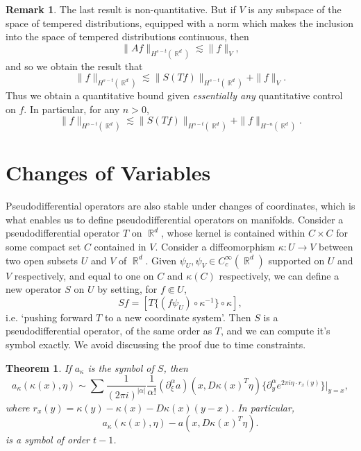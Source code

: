 \documentclass{article}
\DeclareMathOperator{\RR}{\mathbb{R}}
\theoremstyle{plain}
\newtheorem{theorem}{Theorem}
\theoremstyle{definition}
\newtheorem*{remark}{Remark}
\begin{document}
\begin{remark}
    The last result is non-quantitative. But if $V$ is any subspace of the space of tempered distributions, equipped with a norm which makes the inclusion into the space of tempered distributions continuous, then
    \[ \| Af \|_{H^{s-t}(\RR^d)} \lesssim \| f \|_V, \]
    and so we obtain the result that
    \[ \| f \|_{H^{s-t}(\RR^d)} \lesssim \| S(Tf) \|_{H^{s-t}(\RR^d)} + \| f \|_V. \]
    Thus we obtain a quantitative bound given \emph{essentially any} quantitative control on $f$. In particular, for any $n > 0$,
    \[ \| f \|_{H^{s-t}(\RR^d)} \lesssim \| S(Tf) \|_{H^{s-t}(\RR^d)} + \| f \|_{H^{-n}(\RR^d)}. \]
\end{remark}

\section{Changes of Variables}

Pseudodifferential operators are also stable under changes of coordinates, which is what enables us to define pseudodifferential operators on manifolds. Consider a pseudodifferential operator $T$ on $\RR^d$, whose kernel is contained within $C \times C$ for some compact set $C$ contained in $V$. Consider a diffeomorphism $\kappa: U \to V$ between two open subsets $U$ and $V$ of $\RR^d$. Given $\psi_U, \psi_V \in C_c^\infty(\RR^d)$ supported on $U$ and $V$ respectively, and equal to one on $C$ and $\kappa(C)$ respectively, we can define a new operator $S$ on $U$ by setting, for $f \Subset U$,
%
\[ Sf = [ T \{ (f \psi_U) \circ \kappa^{-1} \} \circ \kappa ], \]
%
i.e. `pushing forward $T$ to a new coordinate system'. Then $S$ is a pseudodifferential operator, of the same order as $T$, and we can compute it's symbol exactly. We avoid discussing the proof due to time constraints.

\begin{theorem}
    If $a_\kappa$ is the symbol of $S$, then
    \[ a_\kappa(\kappa(x), \eta) \sim \sum \frac{1}{(2 \pi i)^{|\alpha|}} \frac{1}{\alpha!} (\partial_\xi^\alpha a)(x, D\kappa(x)^T \eta) \{ \partial_y^\alpha e^{2 \pi i \eta \cdot r_x(y)} \} |_{y = x}, \]
    where $r_x(y) = \kappa(y) - \kappa(x) - D\kappa(x)(y - x)$. In particular,
    \[ a_\kappa(\kappa(x), \eta) - a(x, D\kappa(x)^T \eta). \]
    is a symbol of order $t - 1$.
\end{theorem}
\end{document}
